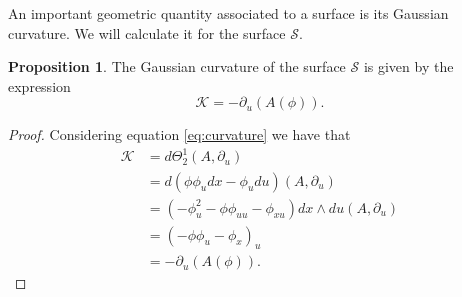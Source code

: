 \documentclass{article}
\theoremstyle{remark}
\theoremstyle{definition}
\newtheorem{proposition}[remark]{Proposition}
\newtheorem{example}[remark]{Example}
\begin{document}
An important geometric quantity associated to a surface is its Gaussian curvature. We will calculate it for the surface $\mathcal{S}$.
\begin{proposition}\label{curvat0}
The Gaussian curvature of the surface $\mathcal{S}$ is given by the expression
\begin{equation}\label{eq:curvat0}
     \mathcal{K}=-\partial_u(A(\phi)).
\end{equation}
\end{proposition}
\begin{proof}
Considering equation \eqref{eq:curvature} we have that
\begin{align*}
\mathcal{K} &= d\Theta^1_2(A,\partial_u) \\
  &= d(\phi \phi_u dx -\phi_u du)(A,\partial_u) \\
  &= \left(-\phi_u^2-\phi\phi_{uu}-\phi_{xu}\right)dx\wedge du(A,\partial_u) \\
  &= (-\phi \phi_u-\phi_x)_u \\
  &= -\partial_u(A(\phi)).
\end{align*}
\end{proof}




\end{document}
